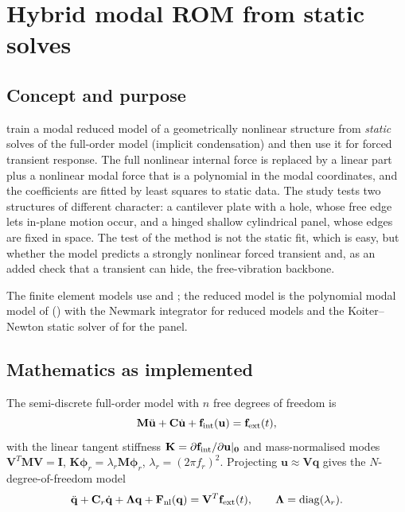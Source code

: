 \section{Hybrid modal ROM from static solves}\label{sec:vf-hyrom}

\subsection*{Concept and purpose}

\citet{yang2019hybrid} train a modal reduced model of a geometrically nonlinear structure from \emph{static} solves of the full-order model (implicit condensation) and then use it for forced transient response. The full nonlinear internal force is replaced by a linear part plus a nonlinear modal force that is a polynomial in the modal coordinates, and the coefficients are fitted by least squares to static data. The study tests two structures of different character: a cantilever plate with a hole, whose free edge lets in-plane motion occur, and a hinged shallow cylindrical panel, whose edges are fixed in space. The test of the method is not the static fit, which is easy, but whether the model predicts a strongly nonlinear forced transient and, as an added check that a transient can hide, the free-vibration backbone.

The finite element models use  and ; the reduced model is the polynomial modal model of \rom{} () with the Newmark integrator for reduced models and the Koiter--Newton static solver of \fea{} for the panel.

\subsection*{Mathematics as implemented}

The semi-discrete full-order model with $n$ free degrees of freedom is
\begin{equation}\label{eq:hy-fom}
\mathbf M\ddot{\mathbf u}+\mathbf C\dot{\mathbf u}+\mathbf f_{\rm int}(\mathbf u)=\mathbf f_{\rm ext}(t),
\end{equation}
with the linear tangent stiffness $\mathbf K=\partial\mathbf f_{\rm int}/\partial\mathbf u|_{\mathbf 0}$ and mass-normalised modes $\mathbf V^{T}\mathbf M\mathbf V=\mathbf I$, $\mathbf K\boldsymbol\phi_r=\lambda_r\mathbf M\boldsymbol\phi_r$, $\lambda_r=(2\pi f_r)^2$. Projecting $\mathbf u\approx\mathbf V\mathbf q$ gives the $N$-degree-of-freedom model
\begin{equation}\label{eq:hy-rom}
\ddot{\mathbf q}+\mathbf C_r\dot{\mathbf q}+\boldsymbol\Lambda\mathbf q+\mathbf F_{\rm nl}(\mathbf q)=\mathbf V^{T}\mathbf f_{\rm ext}(t),\qquad\boldsymbol\Lambda=\operatorname{diag}(\lambda_r).
\end{equation}

